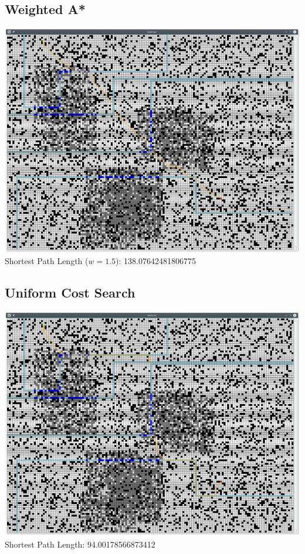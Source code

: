\documentclass[12pt]{article}
\begin{document}
\subsection{Weighted A*}
\includegraphics[scale=0.415]{W1_5_aStar1.png}
\newline
Shortest Path Length (\(w = 1.5\)): 138.07642481806775

\subsection{Uniform Cost Search}
\includegraphics[scale=0.415]{Uniform1.png}
\newline
Shortest Path Length: 94.00178566873412
\end{document}
